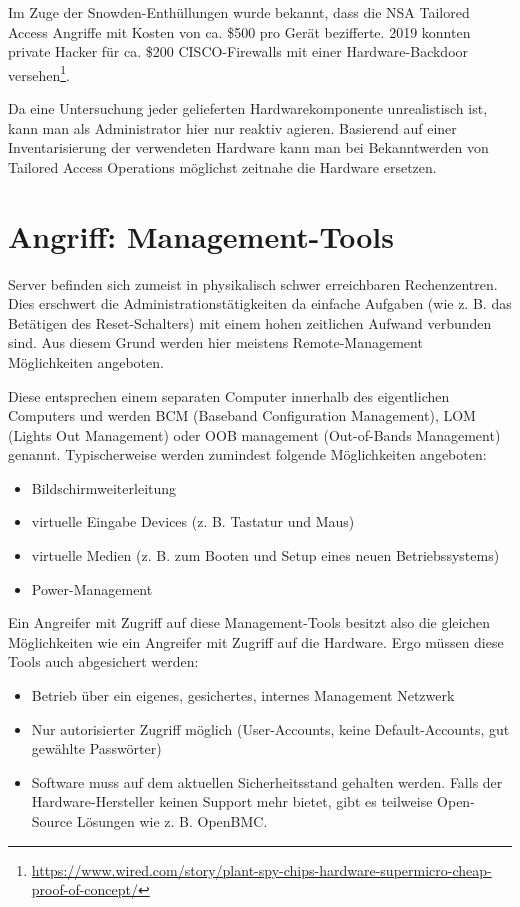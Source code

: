 Im Zuge der Snowden-Enthüllungen wurde bekannt, dass die NSA Tailored Access Angriffe mit Kosten von ca. \$500 pro Gerät bezifferte. 2019 konnten private Hacker für ca. \$200 CISCO-Firewalls mit einer Hardware-Backdoor versehen\footnote{\url{https://www.wired.com/story/plant-spy-chips-hardware-supermicro-cheap-proof-of-concept/}}.

Da eine Untersuchung jeder gelieferten Hardwarekomponente unrealistisch ist, kann man als Administrator hier nur reaktiv agieren. Basierend auf einer Inventarisierung der verwendeten Hardware kann man bei Bekanntwerden von Tailored Access Operations möglichst zeitnahe die Hardware ersetzen.

\section{Angriff: Management-Tools}

Server befinden sich zumeist in physikalisch schwer erreichbaren Rechenzentren. Dies erschwert die Administrationstätigkeiten da einfache Aufgaben (wie z. B. das Betätigen des Reset-Schalters) mit einem hohen zeitlichen Aufwand verbunden sind. Aus diesem Grund werden hier meistens Remote-Management Möglichkeiten angeboten.

Diese entsprechen einem separaten Computer innerhalb des eigentlichen Computers und werden BCM (Baseband Configuration Management), LOM (Lights Out Management) oder OOB management (Out-of-Bands Management) genannt. Typischerweise werden zumindest folgende Möglichkeiten angeboten:

\begin{itemize}
	\item Bildschirmweiterleitung
	\item virtuelle Eingabe Devices (z. B. Tastatur und Maus)
	\item virtuelle Medien (z. B. zum Booten und Setup eines neuen Betriebssystems)
	\item Power-Management
\end{itemize}

Ein Angreifer mit Zugriff auf diese Management-Tools besitzt also die gleichen Möglichkeiten wie ein Angreifer mit Zugriff auf die Hardware. Ergo müssen diese Tools auch abgesichert werden:

\begin{itemize}
	\item Betrieb über ein eigenes, gesichertes, internes Management Netzwerk
	\item Nur autorisierter Zugriff möglich (User-Accounts, keine Default-Accounts, gut gewählte Passwörter)
	\item Software muss auf dem aktuellen Sicherheitsstand gehalten werden. Falls der Hardware-Hersteller keinen Support mehr bietet, gibt es teilweise Open-Source Lösungen wie z. B. OpenBMC.
\end{itemize}

